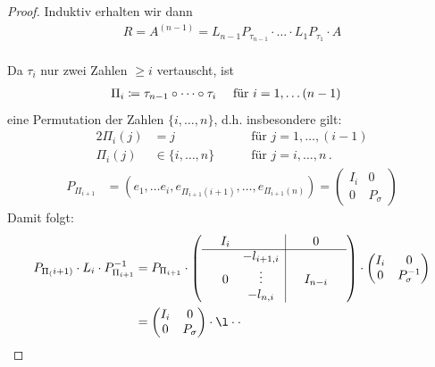 \documentclass[ngerman,fontsize=11pt, paper=a4, parskip=half, titlepage=true, toc=bib]{scrbook}
\begin{document}
\begin{proof}
  Induktiv erhalten wir dann
  \begin{gather*}
    R = A^{(n-1)} = L_{n-1}P_{\tau_{n-1}} \cdot \dotsc \cdot L_1 P_{\tau_1} \cdot A
  \end{gather*}\\
  Da $\tau_i$ nur zwei Zahlen $\geq i $ vertauscht, ist
  \begin{align*}\index{Vorwärtselimination}
    \Pi_i  &\coloneqq \tau_{n-1} \circ \dots \circ \tau_i \quad\text{ für } i=1,\dots (n-1) 
  \end{align*}
  eine Permutation der Zahlen $\{i,\dots, n\}$, d.h. insbesondere gilt:
  \begin{alignat*}{2}
    \Pi_i(j)&=j  & \quad &\text{ für } j=1,\dots,(i-1) \\
    \Pi_i(j)&\in \{i, \dots, n\} & &\text{~für~}j=i,\dots, n\,. 
  \end{alignat*}
  \begin{align*}
    P _{\Pi_{i+1}}  &= (e_1, \dotsc e_i, e_{\Pi_{i+1}(i+1)}, \dotsc, e_{\Pi_{i+1}(n)}) 
                      = \begin{pmatrix}
                        I_i & 0 \\
                        0 & P_{\sigma}
                      \end{pmatrix}
  \end{align*}
  Damit folgt:
  \begin{align*}
    P_{\Pi_(i+1)}\cdot L_i\cdot P_{\Pi_{i+1}}^{-1}
         &= P_{\Pi_{i+1}} \cdot 
            \left(\begin{array}{ccc|ccc}
                     & I_i & && 0 & \\
                     \cline{1-6}
                     & & -l_{i+1, i} & & & \\
                     &  0 &  \vdots  & & I_{n-i} &\\
                     &    & -l_{n, i} & &  & 
                  \end{array}\right)
              \cdot\begin{pmatrix}
                      I_i & 0 \\
                      0 & P_{\sigma}^{-1}
                   \end{pmatrix}\\
         &= \begin{pmatrix}
               I_i & 0 \\
               0 & P_{\sigma}
            \end{pmatrix}
            \cdot   \l\cdot  \cdot

\end{align*}
\end{proof}
\end{document}

